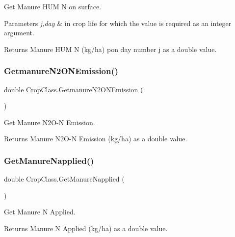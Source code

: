 Get Manure H\+UM N on surface. 


\begin{DoxyParams}{Parameters}
{\em j,day} & in crop life for which the value is required as an integer argument. \\
\hline
\end{DoxyParams}
\begin{DoxyReturn}{Returns}
Manure H\+UM N (kg/ha) pon day number j as a double value. 
\end{DoxyReturn}
\mbox{\label{class_crop_class_aab815966a749158b0dd7bed57f67d1d7}} 
\subsubsection{\texorpdfstring{GetmanureN2ONEmission()}{GetmanureN2ONEmission()}}
{\footnotesize\ttfamily double Crop\+Class.\+Getmanure\+N2\+O\+N\+Emission (\begin{DoxyParamCaption}{ }\end{DoxyParamCaption})\hspace{0.3cm}{\ttfamily [inline]}}



Get Manure N2\+O-\/N Emission. 

\begin{DoxyReturn}{Returns}
Manure N2\+O-\/N Emission (kg/ha) as a double value. 
\end{DoxyReturn}
\mbox{\label{class_crop_class_a6e0998fc257ff97443ea945226a12f89}} 
\subsubsection{\texorpdfstring{GetManureNapplied()}{GetManureNapplied()}}
{\footnotesize\ttfamily double Crop\+Class.\+Get\+Manure\+Napplied (\begin{DoxyParamCaption}{ }\end{DoxyParamCaption})\hspace{0.3cm}{\ttfamily [inline]}}



Get Manure N Applied. 

\begin{DoxyReturn}{Returns}
Manure N Applied (kg/ha) as a double value. 
\end{DoxyReturn}
\mbox{\label{class_crop_class_aa532ea6df8a69a2d0b44a42ce7d862e1}} 
